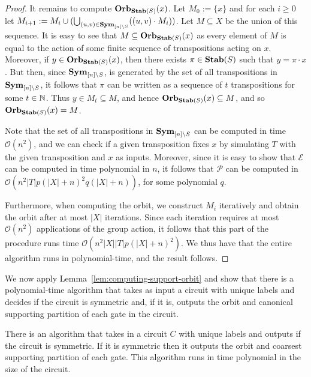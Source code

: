 \documentclass[../paper.tex]{subfiles}
\begin{document}
\begin{proof}
  It remains to compute $\text{\textbf{Orb}}_{\text{\textbf{Stab}}(S)}(x)$. Let $M_0 := \{x\}$ and for each $i
  \geq 0$ let $M_{i+1} := M_i\cup (\bigcup_{(u,v) \in \text{\textbf{Sym}}_{[n] \setminus S}}
  ((u,v) \cdot M_i))$. Let $M \subseteq X$ be the union of this sequence. It is
  easy to see that $M \subseteq \text{\textbf{Orb}}_{\text{\textbf{Stab}}(S)}(x)$ as every element of $M$ is
  equal to the action of some finite sequence of transpositions acting on $x$.
  Moreover, if $y \in \text{\textbf{Orb}}_{\text{\textbf{Stab}}(S)}(x)$, then there exists $\pi \in \text{\textbf{Stab}}(S)$
  such that $y = \pi \cdot x$. But then, since $\text{\textbf{Sym}}_{[n] \setminus S}$, is
  generated by the set of all transpositions in $\text{\textbf{Sym}}_{[n] \setminus S}$, it
  follows that $\pi$ can be written as a sequence of $t$ transpositions for some
  $t \in \mathbb{N}$. Thus $y \in M_t \subseteq M$, and hence $\text{\textbf{Orb}}_{\text{\textbf{Stab}}(S)}(x)
  \subseteq M$, and so $\text{\textbf{Orb}}_{\text{\textbf{Stab}}(S)}(x) = M$.

  Note that the set of all transpositions in $\text{\textbf{Sym}}_{[n] \setminus S}$ can be
  computed in time $\mathcal{O}(n^{2})$, and we can check if a given
  transposition fixes $x$ by simulating $T$ with the given transposition and $x$
  as inputs. Moreover, since it is easy to show that $\mathcal{E}$ can be
  computed in time polynomial in $n$, it follows that $\mathcal{P}$ can be
  computed in $\mathcal{O} (n^2 \vert T \vert p(\vert X \vert +n)^2 q(\vert X
  \vert + n))$, for some polynomial $q$.

  Furthermore, when computing the orbit, we construct $M_i$
  iteratively and obtain the orbit after at most $\vert X \vert$
  iterations. Since each iteration requires at
  most $\mathcal{O} (n^{2})$ applications of the group action, it follows that
  this part of the procedure runs time $\mathcal{O}(n^2\vert X \vert \vert T
  \vert p (\vert X \vert + n)^2)$. We thus have that the entire algorithm runs
  in polynomial-time, and the result follows.
\end{proof}

We now apply Lemma~\ref{lem:computing-support-orbit} and show that there is a
polynomial-time algorithm that takes as input a circuit with unique labels and
decides if the circuit is symmetric and, if it is, outputs the orbit and
canonical supporting partition of each gate in the circuit.

\begin{lem}
  There is an algorithm that takes in a circuit $C$ with unique labels and
  outputs if the circuit is symmetric. If it is symmetric then it outputs the
  orbit and coarsest supporting partition of each gate. This algorithm runs in
  time polynomial in the size of the circuit.
  \label{lem:computing-support-orbit-gate}
\end{lem}
\end{document}
